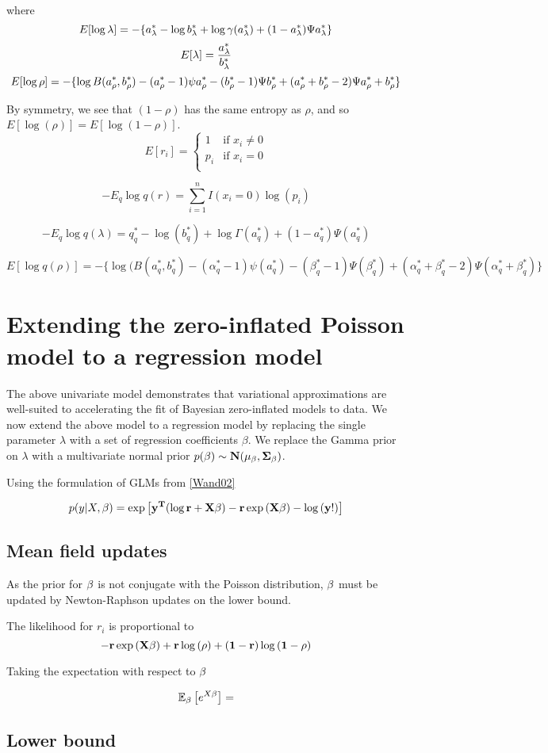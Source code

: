 \documentclass{amsart}
\begin{document}
where
$$
E [\log{\lambda}] = -\{ a_\lambda^* - \log{b_\lambda^*} + \log{\gamma(a_\lambda^*)} + (1 - a_\lambda^*) \Psi{a_\lambda^*} \} \\
$$
$$
E [\lambda] = \frac{a_\lambda^*}{b_\lambda^*} \\
$$
$$
E[\log{\rho}] = - \{ \log{B(a_\rho^*, b_\rho^*)} - (a_\rho^* - 1) \psi{a_\rho^*} - (b_\rho^* - 1)\Psi{b_\rho^*} + (a_\rho^* + b_\rho^* - 2)\Psi{a_\rho^* + b_\rho^*} \} \\
$$

By symmetry, we see that $(1 - \rho)$ has the same entropy as $\rho$,
and so $E [\log{(\rho)}] = E [\log{(1 - \rho)}]$.
$$
E[r_i] = 
	\begin{cases}
	1 & \text{if } x_i \ne 0 \\
	p_i & \text{if } x_i = 0 \\
	\end{cases}
$$

$$
-E_q \log{q(r)} = \sum_{i=1}^n I(x_i = 0) \log{(p_i)}
$$

$$
-E_q \log{q(\lambda)} = q_q^* - \log{(b_q^*)} + \log{\Gamma{(a_q^*)}} + (1 - a_q^*) \Psi{(a_q^*)}
$$

$$
E[\log{q(\rho)}] = - \{ \log{(B(a_q^*, b_q^*)} - (\alpha_q^* - 1) \psi{(a_q^*)} - (\beta_q^* - 1)\Psi{(\beta_q^*)} + (\alpha_q^* + \beta_q^* - 2)\Psi{(\alpha_q^* + \beta_q^*)} \}
$$

\section{Extending the zero-inflated Poisson model to a regression model}
The above univariate model demonstrates that variational approximations are well-suited
to accelerating the fit of Bayesian zero-inflated models to data. We now extend the above
model to a regression model by replacing the single parameter $\lambda$ with a set of
regression coefficients $\beta$. We replace the Gamma prior on $\lambda$ with a multivariate
normal prior $p(\bf \beta) \sim N(\mu_\beta, \Sigma_\beta)$.

Using the formulation of GLMs from \ref{Wand02}

$$
p(y|X, \bf \beta) = \exp{\left[ \bf y^T(\log{\bf r} + X\bf \beta) - \bf r\exp{(X\bf \beta)} - \log{(\bf y!)} \right]}
$$

\subsection{Mean field updates}
As the prior for $\bf \beta$ is not conjugate with the Poisson distribution, $\bf \beta$ must be
updated by Newton-Raphson updates on the lower bound.

The likelihood for $r_i$ is proportional to
$$
-\bf r \exp{\left(X\bf \beta\right)} + \bf r \log{(\rho)} + (1 - \bf r) \log{(1 - \rho)}
$$

Taking the expectation with respect to $\bf \beta$

$$
\mathbb{E_{\vbeta}}\left[ e^{X \vbeta} \right] = %
$$

\subsection{Lower bound}
\end{document}
